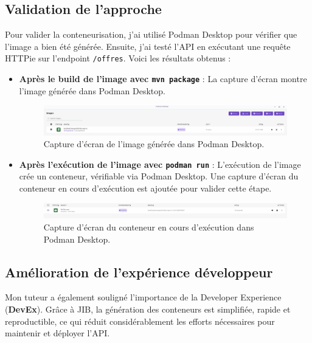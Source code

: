 \documentclass[11pt]{article}
\begin{document}
		\subsection*{Validation de l'approche}
		
		Pour valider la conteneurisation, j'ai utilisé Podman Desktop pour vérifier que l'image a bien été générée. Ensuite, j'ai testé l'API en exécutant une requête HTTPie sur l'endpoint \texttt{/offres}. Voici les résultats obtenus :
		\begin{itemize}
			\item \textbf{Après le build de l'image avec \texttt{mvn package}} : La capture d'écran montre l'image générée dans Podman Desktop.
			\begin{figure}[h!]
				\centering
				\includegraphics[width=1\textwidth]{asset/image_podman.png}
				\caption{Capture d'écran de l'image générée dans Podman Desktop.}
				\label{fig:image_podman}
			\end{figure}
			
			\item \textbf{Après l'exécution de l'image avec \texttt{podman run}} : L'exécution de l'image crée un conteneur, vérifiable via Podman Desktop. Une capture d'écran du conteneur en cours d'exécution est ajoutée pour valider cette étape.
			\begin{figure}[h!]
				\centering
				\includegraphics[width=1\textwidth]{asset/conteneur_podman.png}
				\caption{Capture d'écran du conteneur en cours d'exécution dans Podman Desktop.}
				\label{fig:conteneur_podman}
			\end{figure}
		\end{itemize}
		\subsection*{Amélioration de l'expérience développeur}
		
		Mon tuteur a également souligné l'importance de la Developer Experience (\textbf{DevEx}). Grâce à JIB, la génération des conteneurs est simplifiée, rapide et reproductible, ce qui réduit considérablement les efforts nécessaires pour maintenir et déployer l'API.
		
\end{document}
